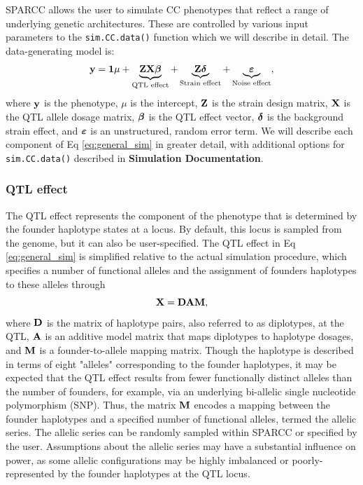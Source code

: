 SPARCC allows the user to simulate CC phenotypes that reflect a range of underlying genetic architectures. These are controlled by various input parameters to the \texttt{sim.CC.data()} function which we will describe in detail. The data-generating model is:
\begin{equation}
	\mathbf{y} = \mathbf{1}\mu + \underbrace{\mathbf{Z}\mathbf{X}\boldsymbol{\beta}}_{\text{QTL effect}} + \underbrace{\mathbf{Z}\boldsymbol{\delta}}_{\text{Strain effect}} + \underbrace{\boldsymbol{\varepsilon}}_{\text{Noise effect}},
    \label{eq:general_sim}
\end{equation}
where $\mathbf{y}$ is the phenotype, $\mu$ is the intercept, $\mathbf{Z}$ is the strain design matrix, $\mathbf{X}$ is the QTL allele dosage matrix, $\boldsymbol{\beta}$ is the QTL effect vector, $\boldsymbol{\delta}$ is the background strain effect, and $\boldsymbol{\varepsilon}$ is an unstructured, random error term. We will describe each component of Eq \ref{eq:general_sim} in greater detail, with additional options for \texttt{sim.CC.data()} described in \textbf{Simulation Documentation}.

\subsubsection{QTL effect}
The QTL effect represents the component of the phenotype that is determined by the founder haplotype states at a locus. By default, this locus is sampled from the genome, but it can also be user-specified. The QTL effect in Eq \ref{eq:general_sim} is simplified relative to the actual simulation procedure, which specifies a number of functional alleles and the assignment of founders haplotypes to these alleles \citep{Yalcin2005} through 
\begin{equation}
	\mathbf{X} = \mathbf{D}\mathbf{A}\mathbf{M},
    \label{eq:sdp}
\end{equation}
where $\mathbf{D}$ is the matrix of haplotype pairs, also referred to as diplotypes, at the QTL, $\mathbf{A}$ is an additive model matrix that maps diplotypes to haplotype dosages, and $\mathbf{M}$ is a founder-to-allele mapping matrix. Though the haplotype is described in terms of eight "alleles" corresponding to the founder haplotypes, it may be expected that the QTL effect results from fewer functionally distinct alleles than the number of founders, for example, via an underlying bi-allelic single nucleotide polymorphism (SNP). Thus, the matrix $\mathbf{M}$ encodes a mapping between the founder haplotypes and a specified number of functional alleles, termed the allelic series. The allelic series can be randomly sampled within SPARCC or specified by the user. Assumptions about the allelic series may have a substantial influence on power, as some allelic configurations may be highly imbalanced or poorly-represented by the founder haplotypes at the QTL locus. 

